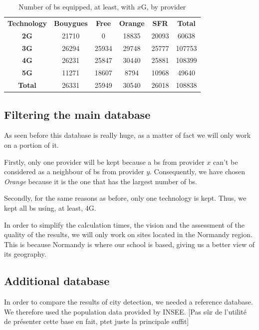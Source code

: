 \documentclass[lettersize,journal,english]{IEEEtran}
\begin{document}
        \begin{table}
            \centering
            \caption{Number of \acrfull{bs} equipped, at least, with $x$G, by provider}
            \label{table:techno_numbers}
            \begin{tabular}{cccccc}
                \toprule
                \textbf{Technology} & \textbf{Bouygues} & \textbf{Free} & \textbf{Orange} & \textbf{SFR} & \textbf{Total} \\
                \cmidrule(lr){1-6}
                \textbf{2G} & 21710 & 0 & 18835 & 20093 & 60638 \\
                \textbf{3G} & 26294 & 25934 & 29748 & 25777 & 107753 \\
                \textbf{4G} & 26231 & 25847 & 30440 & 25881 & 108399 \\
                \textbf{5G} & 11271 & 18607 & 8794 & 10968 & 49640 \\
                \textbf{Total} & 26331 & 25949 & 30540 & 26018 & 108838 \\
                \bottomrule
            \end{tabular}
        \end{table}

    \subsection{Filtering the main database}
        As seen before this database is really huge, as a matter of fact we will only work on a portion of it.

        Firstly, only one provider will be kept because a \acrshort{bs} from provider $x$ can't be considered as a neighbour of \acrshort{bs} from provider $y$.
        Consequently, we have chosen \emph{Orange} because it is the one that has the largest number of \acrshort{bs}.

        Secondly, for the same reasons as before, only one technology is kept. Thus, we kept all \acrshort{bs} using, at least, 4G.

        In order to simplify the calculation times, the vision and the assessment of the quality of the results, we will only work on sites located in the Normandy region.
        This is because Normandy is where our school is based, giving us a better view of its geography.

    \subsection{Additional database}
        In order to compare the results of city detection, we needed a reference database. We therefore used the population data provided by INSEE.
        [Pas sûr de l'utilité de présenter cette base en fait, ptet juste la principale suffit]
\end{document}
